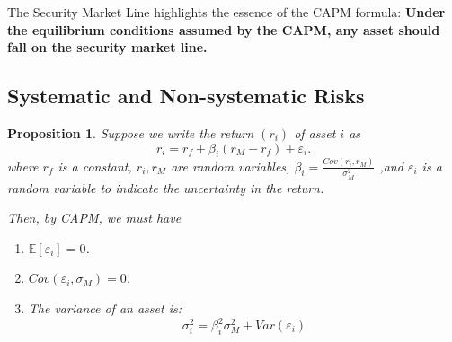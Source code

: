 \documentclass[13pt]{article}
\newtheorem{proposition}[theorem]{Proposition}
\theoremstyle{definition}
\theoremstyle{remark}
\newenvironment{remark}
  {\pushQED{\qed}\renewcommand{\qedsymbol}{$\triangle$}\remarkx}
  {\popQED\endremarkx}
\newcommand{\EE}{\mathbb{E}}
\begin{document}
\begin{remark}
    The Security Market Line highlights the essence of the CAPM formula: \textbf{Under the equilibrium conditions assumed by the CAPM, any asset should fall on the security market line. }
\end{remark}

\subsection{Systematic and Non-systematic Risks}
\begin{proposition}
    Suppose we write the return $\left(r_{i}\right)$ of asset $i$ as
    \[
r_{i}=r_{f}+\beta_{i}\left(r_M-r_{f}\right)+\varepsilon_i .
    \]
    where $r_f$ is a constant, $r_{i}, r_M$ are random variables, $\beta_i=\frac{Cov\left(r_{i}, r_{M}\right)}{\sigma_{M}^{2}}$ ,and $\varepsilon_i$ is a random variable to indicate the uncertainty in the return.
    
    Then, by CAPM, we must have
    \begin{enumerate}[label=(\alph*)]
        \item $\EE[\varepsilon_i]=0$.
        \item $Cov\left(\varepsilon_i, \sigma_{M}\right)=0$.
        \item The variance of an asset is:$$
\sigma_{i}^{2}=\beta_{i}^{2} \sigma_{M}^{2}+Var\left(\varepsilon_i\right)
$$
    \end{enumerate}
\end{proposition}
\end{document}
